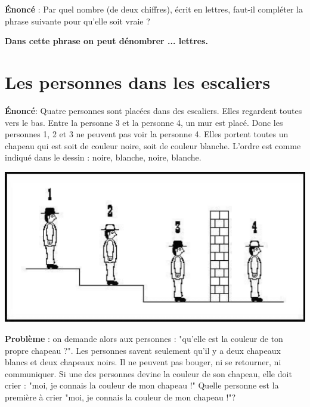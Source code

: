 \documentclass{article}
\begin{document}
\hspace{3cm}

\textbf{Énoncé }: Par quel nombre (de deux chiffres), écrit en lettres, faut-il compléter la phrase suivante pour qu'elle soit vraie ? \\

\begin{center}
	\textbf{Dans cette phrase on peut dénombrer ... lettres. } \\
\end{center}

  

  
\newpage  
\section{Les personnes dans les escaliers}

\textbf{Énoncé}: Quatre personnes sont placées dans des escaliers. Elles regardent toutes vers le bas. Entre la personne 3 et la personne 4, un mur est placé. Donc les personnes 1, 2 et 3 ne peuvent pas voir la personne 4. Elles portent toutes un chapeau qui est soit de couleur noire, soit de couleur blanche. L'ordre est comme indiqué dans le dessin : noire, blanche, noire, blanche. \\

\begin{center}
	\includegraphics[scale=0.45]{Figures/Bonhommes.png} 
\end{center}

\textbf{Problème }: on demande alors aux personnes : "qu'elle est la couleur de ton propre chapeau ?". Les personnes savent seulement qu'il y a deux chapeaux blancs et deux chapeaux noirs. Il ne peuvent pas bouger, ni se retourner, ni communiquer. Si une des personnes devine la couleur de son chapeau, elle doit crier : "moi, je connais la couleur de mon chapeau !"
Quelle personne est la première à crier "moi, je connais la couleur de mon chapeau !"?
\end{document}

